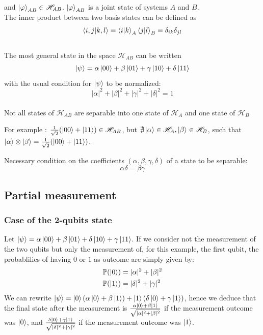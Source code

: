 \documentclass{article}
\begin{document}
and $\ket{\varphi}_{AB} \in \mathscr{H}_{AB}$. $\ket{\varphi}_{AB}$ is a joint state
of systems $A$ and $B$. \\\noindent The inner product between two basis states
can be defined as
\begin{equation}
    \braket{i,j|k,l}=\braket{i|k}_A\braket{j|l}_B = \delta_{ik}\delta_{jl}
\end{equation}
\\\noindent The most general state in the space $\mathscr{H}_{AB}$ can be
written
\begin{equation}
    \ket{\psi} = \alpha \ket{00} + \beta \ket{01} + \gamma \ket{10} + \delta \ket{11}
\end{equation}
with the usual condition for $\ket{\psi}$ to be normalized:
\begin{equation}
    |\alpha|^2+|\beta|^2+|\gamma|^2+|\delta|^2 = 1
\end{equation}
\\\noindent Not all states of $\mathscr{H}_{AB}$ are separable into one state of
$\mathscr{H}_{A}$ and one state of $\mathscr{H}_{B}$

For example : $\frac{1}{\sqrt{2}}(\ket{00} + \ket{11}) \in \mathscr{H}_{AB}$,
but $\nexists \ket{\alpha}\in \mathscr{H}_A, \ket{\beta}\in \mathscr{H}_B$, such
that \\\noindent $\ket{\alpha}\otimes\ket{\beta} = \frac{1}{\sqrt{2}}(\ket{00} +
\ket{11})$.

Necessary condition on the coefficients $(\alpha, \beta, \gamma, \delta)$ of a
state to be separable:
\begin{equation}
    \alpha\delta = \beta\gamma
\end{equation}

\subsection{Partial measurement}
\subsubsection*{Case of the 2-qubits state}
Let $\ket{\psi} = \alpha \ket{00} + \beta \ket{01} + \delta \ket{10} + \gamma
\ket{11}$. If we consider not the measurement of the two qubits but only the
measurement of, for this example, the first qubit, the probablilies of having
$0$ or $1$ as outcome are simply given by:
\begin{equation}
    \begin{aligned}
        \mathbb{P}(\ket{0}) & = |\alpha|^2 + |\beta|^2 \\
        \mathbb{P}(\ket{1}) & = |\delta|^2 + |\gamma|^2
    \end{aligned}
\end{equation}
We can rewrite $\ket{\psi} = \ket{0}(\alpha \ket{0} + \beta \ket{1}) +
\ket{1}(\delta \ket{0} + \gamma \ket{1})$, hence we deduce that the final state
after the measurement is $\frac{\alpha \ket{0} + \beta \ket{1}}{\sqrt{|\alpha|^2
+ |\beta|^2}}$ if the measurement outcome was $\ket{0}$, and
$\frac{\delta \ket{0} + \gamma \ket{1}}{\sqrt{ |\delta|^2 +
|\gamma|^2}}$ if the measurement outcome was $\ket{1}$.
\end{document}
